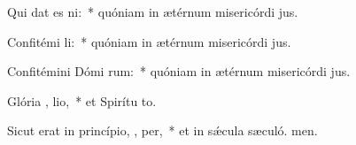 \item Qui dat es  ni:~* quóniam in ætérnum misericórdi jus.
\item Confitémi  li:~* quóniam in ætérnum misericórdi jus.
\item Confitémini Dómi rum:~* quóniam in ætérnum misericórdi jus.
\item Glória ,  lio,~* et Spirítu to.
\item Sicut erat in princípio,  ,  per,~* et in sǽcula sæculó. men.
